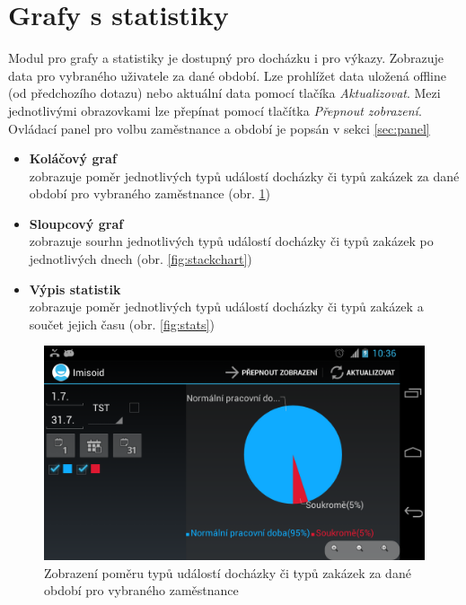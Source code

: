 \documentclass{diplomka}
\begin{document}
\section{Grafy s statistiky}
\label{sec:charts}
Modul pro grafy a statistiky je dostupný pro docházku i pro výkazy. Zobrazuje data pro vybraného uživatele za dané období. Lze prohlížet data uložená offline (od předchozího dotazu) nebo aktuální data pomocí tlačíka \emph{Aktualizovat}. Mezi jednotlivými obrazovkami lze přepínat pomocí tlačítka \emph{Přepnout zobrazení}. Ovládací panel pro volbu zaměstnance a období je popsán v sekci \ref{sec:panel}
\begin{itemize}[noitemsep,nolistsep]
\item \textbf{Koláčový graf}\\ zobrazuje poměr jednotlivých typů událostí docházky či typů zakázek za dané období pro vybraného zaměstnance (obr. \ref{fig:piechart})
\item \textbf{Sloupcový graf}\\zobrazuje sourhn jednotlivých typů událostí docházky či typů zakázek po jednotlivých dnech (obr. \ref{fig:stackchart})
\item \textbf{Výpis statistik}\\zobrazuje poměr jednotlivých typů událostí docházky či typů zakázek a součet jejich času (obr. \ref{fig:stats})
\end{itemize}

\begin{figure}[H]
  \centering
  \includegraphics[scale=0.25]{scr/piechart.png}
  \caption{Zobrazení poměru typů událostí docházky či typů zakázek za dané období pro vybraného zaměstnance}
  \label{fig:piechart}
\end{figure}
\end{document}
